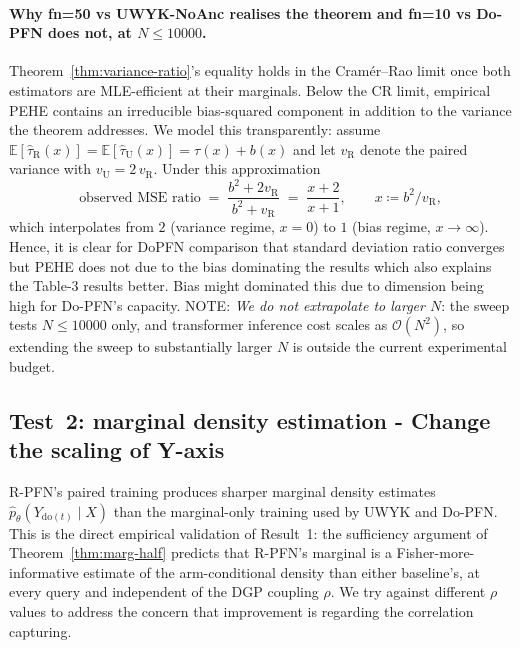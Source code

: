 \documentclass[11pt]{article}
\theoremstyle{remark}
\newcommand{\EE}{\mathbb{E}}
\begin{document}
\paragraph{Why fn=50 vs UWYK-NoAnc realises the theorem and fn=10 vs
Do-PFN does not, at $N \leq 10000$.}
Theorem~\ref{thm:variance-ratio}'s equality holds in the
Cram\'er--Rao limit once both estimators are MLE-efficient at their marginals. Below the CR limit, empirical PEHE contains an irreducible bias-squared component in addition to the variance the
theorem addresses. We model this transparently: assume
$\EE[\hat\tau_{\mathrm{R}}(x)] = \EE[\hat\tau_{\mathrm{U}}(x)]
 = \tau(x) + b(x)$ and let $v_{\mathrm{R}}$ denote the
paired variance with $v_{\mathrm{U}} = 2\,v_{\mathrm{R}}$. Under
this approximation
\begin{equation}
  \text{observed MSE ratio}
  \;=\;
  \frac{b^2 + 2 v_{\mathrm{R}}}{b^2 + v_{\mathrm{R}}}
  \;=\; \frac{x + 2}{x + 1}, \qquad x \coloneqq b^2 / v_{\mathrm{R}},
  \label{eq:mse-ratio-x}
\end{equation}
which interpolates from $2$ (variance regime, $x = 0$) to $1$ (bias
regime, $x \to \infty$).  Hence, it is clear for DoPFN comparison that standard deviation ratio converges but PEHE does not due to the bias dominating the results which also explains the Table-3 results better. Bias might dominated this due to dimension being high for Do-PFN's capacity. NOTE: \emph{We do not extrapolate to larger $N$}: the sweep tests $N \leq 10000$ only, and transformer
inference cost scales as $\mathcal{O}(N^2)$, so extending the sweep
to substantially larger $N$ is outside the current experimental
budget. 

\subsection{Test~2: marginal density estimation - Change the scaling of Y-axis}
\label{subsec:test2}

R-PFN's paired training produces sharper marginal density estimates $\hat p_\theta(Y_{\mathrm{do}(t)} \mid X)$ than the
marginal-only training used by UWYK and Do-PFN. This is the direct
empirical validation of Result~1: the sufficiency argument of
Theorem~\ref{thm:marg-half} predicts that R-PFN's marginal is a
Fisher-more-informative estimate of the arm-conditional density than
either baseline's, at every query and independent of the DGP coupling
$\rho$. We try against different $\rho$ values to address the concern that improvement is regarding the correlation capturing. 
\end{document}
